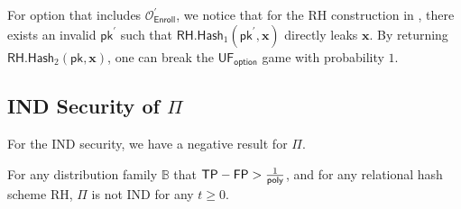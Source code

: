 For \textsf{option} that includes $\mathcal{O}_\textsf{Enroll}^\prime$, we notice that for the \textsf{RH} construction in \cite{cryptoeprint:2014/394}, there exists an invalid $\textsf{pk}^\prime$ such that $\textsf{RH.Hash}_1(\textsf{pk}^\prime, \mathbf{x})$ directly leaks $\mathbf{x}$. By returning $\textsf{RH.Hash}_2( \textsf{pk}, \mathbf{x} )$, one can break the $\textsf{UF}_{\textsf{option}}$ game with probability $1$.



\subsection{IND Security of $\Pi$}
\label{sec:security_analysis:rh:IND}

For the IND security, we have a negative result for $\Pi$.

\begin{theorem}

For any distribution family $\mathbb{B}$ that $\textsf{TP} - \textsf{FP} > \frac{1}{\mathsf{poly}}$, and for any relational hash scheme \textsf{RH}, $\Pi$ is not IND for any $t \geq 0$.

\end{theorem}

